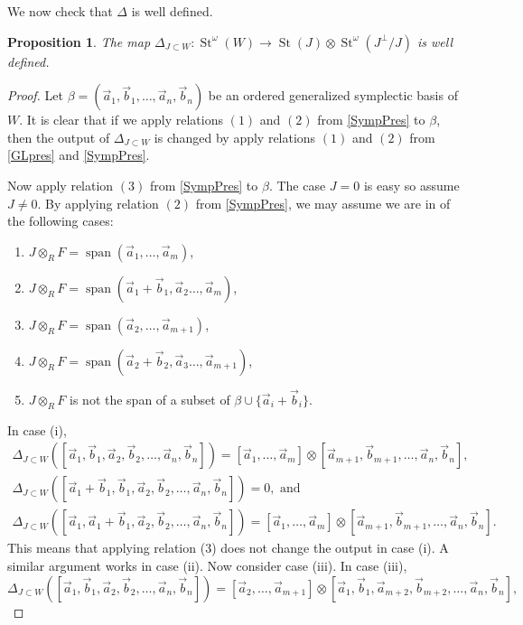 \documentclass[11pt,letterpaper]{amsart}
\DeclareMathOperator{\Span}{span}
\numberwithin{theoremcounter}{section}
\newtheorem{proposition}[propositionauto]{Proposition}
\theoremstyle{definition}
\theoremstyle{remark}
\DeclareMathOperator{\St}{St}
\begin{document}
We now check that $\Delta$ is well defined. 

\begin{proposition}
    The map $\Delta_{J \subset W}\colon  \St^\omega(W) \to \St(J) \otimes \St^\omega(J^\perp/J)$ is well defined.
\end{proposition}

\begin{proof} Let $\beta=(\vec a_1,\vec b_1,\ldots,\vec a_n,\vec b_n)$ be an ordered generalized symplectic basis of $W$. It is clear that if we apply relations $(1)$ and $(2)$ from \autoref{SympPres} to $\beta$, then the output of $\Delta_{J \subset W}$ is changed by apply relations $(1)$ and $(2)$ from \autoref{GLpres} and \autoref{SympPres}. 

Now apply relation $(3)$ from \autoref{SympPres} to $\beta$. The case $J=0$ is easy so assume $J \neq 0$. By applying relation $(2)$ from \autoref{SympPres}, we may assume we are in of the following cases:
\begin{enumerate}
    \item [i.]  $J \otimes_R F=\Span(\vec a_1,\ldots,\vec a_m)$,
    \item [ii.] $J \otimes_R F=\Span(\vec a_1+\vec b_1,\vec a_2\ldots,\vec a_m)$,
 \item [iii.]  $J \otimes_R F=\Span(\vec a_2,\ldots,\vec a_{m+1})$,
    \item [iv.] $J \otimes_R F=\Span(\vec a_2+\vec b_2,\vec a_3\ldots,\vec a_{m+1})$,
    \item [v.] $J \otimes_R F$ is not the span of a subset of $\beta \cup \{\vec a_i + \vec b_i\}$.
\end{enumerate} In case (i), 
\begin{gather*}\Delta_{J \subset W} ([\vec a_1,\vec b_1, \vec a_2, \vec b_2,\ldots,\vec a_n,\vec b_n  ])=[\vec a_1,\ldots, \vec a_m] \otimes [\vec a_{m+1}, \vec b_{m+1},\ldots,\vec a_n,\vec b_n  ],\\
\Delta_{J \subset W} ([\vec a_1+\vec b_1,\vec b_1, \vec a_2,\vec b_2,\ldots,\vec a_n,\vec b_n  ])=0, \text{ and}\\
\Delta_{J \subset W} ([\vec a_1,\vec a_1+\vec b_1, \vec a_2, \vec b_2,\ldots,\vec a_n,\vec b_n  ])=[\vec a_1,\ldots, \vec a_m] \otimes [\vec a_{m+1}, \vec b_{m+1},\ldots,\vec a_n,\vec b_n  ].
\end{gather*}
This means that applying relation (3) does not change the output in case (i). A similar argument works in case (ii). Now consider case (iii). In case (iii), $$\Delta_{J \subset W} ([\vec a_1,\vec b_1, \vec a_2, \vec b_2,\ldots,\vec a_n,\vec b_n  ])=[\vec a_2,\ldots, \vec a_{m+1}] \otimes [\vec a_1, \vec b_1,\vec a_{m+2}, \vec b_{m+2},\ldots,\vec a_n,\vec b_n  ],$$

\end{proof}
\end{document}
